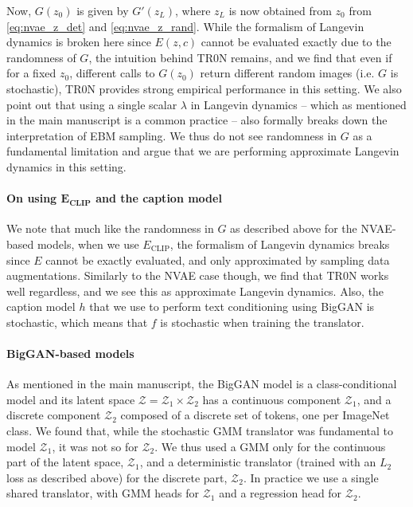 \documentclass[nohyperref]{article}
\theoremstyle{plain}
\theoremstyle{definition}
\theoremstyle{remark}
\begin{document}
Now, $G(z_0)$ is given by $G'(z_L)$, where $z_L$ is now obtained from $z_0$ from \eqref{eq:nvae_z_det} and \eqref{eq:nvae_z_rand}. While the formalism of Langevin dynamics is broken here since $E(z,c)$ cannot be evaluated exactly due to the randomness of $G$, the intuition behind TR0N remains, and we find that even if for a fixed $z_{0}$, different calls to $G(z_{0})$ return different random images (i.e. $G$ is stochastic), TR0N provides strong empirical performance in this setting. We also point out that using a single scalar $\lambda$ in Langevin dynamics -- which as mentioned in the main manuscript is a common practice -- also formally breaks down the interpretation of EBM sampling. We thus do not see randomness in $G$ as a fundamental limitation and argue that we are performing approximate Langevin dynamics in this setting. 


\paragraph{On using $\mathbf{E_\text{CLIP}}$ and the caption model} We note that much like the randomness in $G$ as described above for the NVAE-based models, when we use $E_\text{CLIP}$, the formalism of Langevin dynamics breaks since $E$ cannot be exactly evaluated, and only approximated by sampling data augmentations. Similarly to the NVAE case though, we find that TR0N works well regardless, and we see this as approximate Langevin dynamics. Also, the caption model $h$ that we use to perform text conditioning using BigGAN is stochastic, which means that $f$ is stochastic when training the translator.


\paragraph{BigGAN-based models} As mentioned in the main manuscript, the BigGAN model is a class-conditional model and its latent space $\mathcal{Z}=\mathcal{Z}_1 \times \mathcal{Z}_2$ has a continuous component $\mathcal{Z}_1$, and a discrete component $\mathcal{Z}_2$ composed of a discrete set of tokens, one per ImageNet class. We found that, while the stochastic GMM translator was fundamental to model $\mathcal{Z}_1$, it was not so for $\mathcal{Z}_2$. We thus used a GMM only for the continuous part of the latent space, $\mathcal{Z}_1$, and a deterministic translator (trained with an $L_2$ loss as described above) for the discrete part, $\mathcal{Z}_2$. In practice we use a single shared translator, with GMM heads for $\mathcal{Z}_1$ and a regression head for $\mathcal{Z}_2$.
\end{document}

